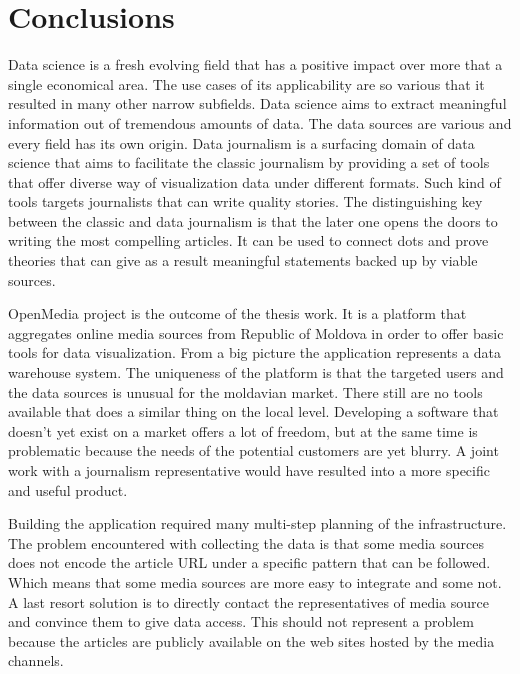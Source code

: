 \section*{Conclusions}
Data science is a fresh evolving field that has a positive impact over more that a single economical area. The use cases of its applicability are so various that it resulted in many other narrow subfields. Data science aims to extract meaningful information out of tremendous amounts of data. The data sources are various and every field has its own origin. Data journalism is a surfacing domain of data science that aims to facilitate the classic journalism by providing a set of tools that offer diverse way of visualization data under different formats. Such kind of tools targets journalists that can write quality stories. The distinguishing key between the classic and data journalism is that the later one opens the doors to writing the most compelling articles. It can be used to connect dots and prove theories that can give as a result meaningful statements backed up by viable sources.

OpenMedia project is the outcome of the thesis work. It is a platform that aggregates online media sources from Republic of Moldova in order to offer basic tools for data visualization. From a big picture the application represents a data warehouse system. The uniqueness of the platform is that the targeted users and the data sources is unusual for the moldavian market. There still are no tools available that does a similar thing on the local level. Developing a software that doesn't yet exist on a market offers a lot of freedom, but at the same time is problematic because the needs of the potential customers are yet blurry. A joint work with a journalism representative would have resulted into a more specific and useful product.

Building the application required many multi-step planning of the infrastructure. The problem encountered with collecting the data is that some media sources does not encode the article URL under a specific pattern that can be followed. Which means that some media sources are more easy to integrate and some not. A last resort solution is to directly contact the representatives of media source and convince them to give data access. This should not represent a problem because the articles are publicly available on the web sites hosted by the media channels.

